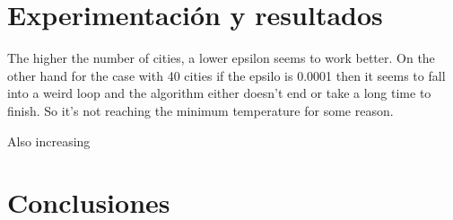 \documentclass[a4paper]{article}
\begin{document}
\section*{Experimentaci\'on y resultados}
The higher the number of cities, a lower epsilon seems to work better. On the other hand for the case with 40 cities if the epsilo is 0.0001 then it seems to fall into a weird loop and the algorithm either doesn't end or take a long time  to finish. So it's not reaching the minimum temperature for some reason.

Also increasing 



\section*{Conclusiones}
\end{document}
